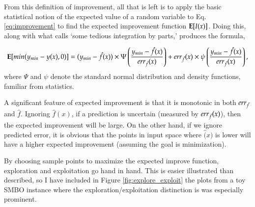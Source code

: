 From this definition of improvement, all that is left is to apply the basic statistical notion of the expected value of a random variable to Eq. \ref{eq:improvement} to find the expected improvement function $\mathbf{E}[I(x)]$. Doing this, along with what \cite{jones_efficient_1998} calls `some tedious integration by parts,' produces the formula,

\begin{equation} \label{eq:exp_improvement}
\mathbf{E}[min(y_{min}-y(x),0)]=(y_{min}-\hat{f}(x))\times\Psi\left(\frac{y_{min}-\hat{f}(x)}{err_{\hat{f}}(x)}\right) + err_{\hat{f}}(x)\times\psi\left(\frac{y_{min}-\hat{f}(x)}{err_{\hat{f}}(x)}\right),
\end{equation}
where $\Psi$ and $\psi$ denote the standard normal distribution and density functions, familiar from statistics.

A significant feature of expected improvement is that it is monotonic in both $err_{\hat{f}}$ and $\hat{f}$. Ignoring $\hat{f}(x)$, if a prediction is uncertain (measured by $err_{\hat{f}}(x)$), then the expected improvement will be large. On the other hand, if we ignore predicted error, it is obvious that the points in input space where $\hat(x)$ is lower will have a higher expected improvement (assuming the goal is minimization). 

By choosing sample points to maximize the expected improve function, exploration and exploitation go hand in hand. This is easier illustrated than described, so I have included in Figure \ref{fig:explore_exploit} the plots from a toy SMBO instance where the exploration/exploitation distinction is was especially prominent.



